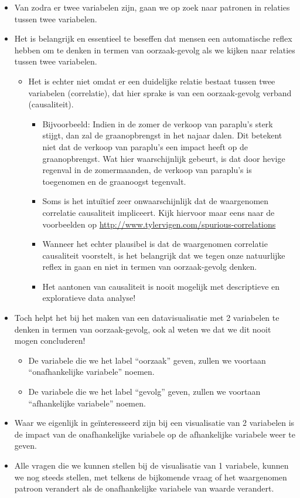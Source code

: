 \documentclass[]{memoir}
\providecommand{\tightlist}{%
  \setlength{\itemsep}{0pt}\setlength{\parskip}{0pt}}
\begin{document}
\begin{itemize}
\tightlist
\item
  Van zodra er twee variabelen zijn, gaan we op zoek naar patronen in relaties tussen twee variabelen.
\item
  Het is belangrijk en essentieel te beseffen dat mensen een automatische reflex hebben om te denken in termen van oorzaak-gevolg als we kijken naar relaties tussen twee variabelen.

  \begin{itemize}
  \tightlist
  \item
    Het is echter niet omdat er een duidelijke relatie bestaat tussen twee variabelen (correlatie), dat hier sprake is van een oorzaak-gevolg verband (causaliteit).

    \begin{itemize}
    \tightlist
    \item
      Bijvoorbeeld: Indien in de zomer de verkoop van paraplu's sterk stijgt, dan zal de graanopbrengst in het najaar dalen. Dit betekent niet dat de verkoop van paraplu's een impact heeft op de graanopbrengst. Wat hier waarschijnlijk gebeurt, is dat door hevige regenval in de zomermaanden, de verkoop van paraplu's is toegenomen en de graanoogst tegenvalt.
    \item
      Soms is het intuïtief zeer onwaarschijnlijk dat de waargenomen correlatie causaliteit impliceert. Kijk hiervoor maar eens naar de voorbeelden op \url{http://www.tylervigen.com/spurious-correlations}
    \item
      Wanneer het echter plausibel is dat de waargenomen correlatie causaliteit voorstelt, is het belangrijk dat we tegen onze natuurlijke reflex in gaan en niet in termen van oorzaak-gevolg denken.
    \item
      Het aantonen van causaliteit is nooit mogelijk met descriptieve en exploratieve data analyse!
    \end{itemize}
  \end{itemize}
\item
  Toch helpt het bij het maken van een datavisualisatie met 2 variabelen te denken in termen van oorzaak-gevolg, ook al weten we dat we dit nooit mogen concluderen!

  \begin{itemize}
  \tightlist
  \item
    De variabele die we het label ``oorzaak'' geven, zullen we voortaan ``onafhankelijke variabele'' noemen.
  \item
    De variabele die we het label ``gevolg'' geven, zullen we voortaan ``afhankelijke variabele'' noemen.
  \end{itemize}
\item
  Waar we eigenlijk in geïnteresseerd zijn bij een visualisatie van 2 variabelen is de impact van de onafhankelijke variabele op de afhankelijke variabele weer te geven.
\item
  Alle vragen die we kunnen stellen bij de visualisatie van 1 variabele, kunnen we nog steeds stellen, met telkens de bijkomende vraag of het waargenomen patroon verandert als de onafhankelijke variabele van waarde verandert.
\end{itemize}
\end{document}
